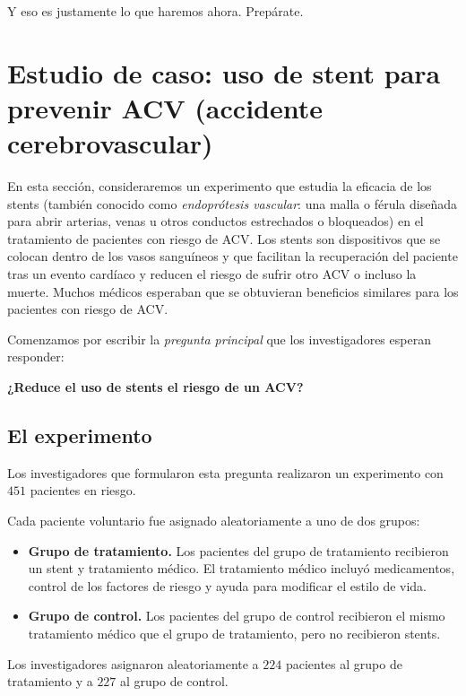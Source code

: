 \documentclass[
  spanish,
  letterpaper,
  DIV=11,
  numbers=noendperiod]{scrartcl}
\providecommand{\tightlist}{%
  \setlength{\itemsep}{0pt}\setlength{\parskip}{0pt}}
\begin{document}
Y eso es justamente lo que haremos ahora. Prepárate.

\section{Estudio de caso: uso de stent para prevenir ACV (accidente
cerebrovascular)}\label{estudio-de-caso-uso-de-stent-para-prevenir-acv-accidente-cerebrovascular}

En esta sección, consideraremos un experimento que estudia la eficacia
de los stents (también conocido como \emph{endoprótesis vascular}: una
malla o férula diseñada para abrir arterias, venas u otros conductos
estrechados o bloqueados) en el tratamiento de pacientes con riesgo de
ACV. Los stents son dispositivos que se colocan dentro de los vasos
sanguíneos y que facilitan la recuperación del paciente tras un evento
cardíaco y reducen el riesgo de sufrir otro ACV o incluso la muerte.
Muchos médicos esperaban que se obtuvieran beneficios similares para los
pacientes con riesgo de ACV.

Comenzamos por escribir la \emph{pregunta principal} que los
investigadores esperan responder:

\textbf{¿Reduce el uso de stents el riesgo de un ACV?}

\subsection{El experimento}\label{el-experimento}

Los investigadores que formularon esta pregunta realizaron un
experimento con \(451\) pacientes en riesgo.

Cada paciente voluntario fue asignado aleatoriamente a uno de dos
grupos:

\begin{itemize}
\tightlist
\item
  \textbf{Grupo de tratamiento.} Los pacientes del grupo de tratamiento
  recibieron un stent y tratamiento médico. El tratamiento médico
  incluyó medicamentos, control de los factores de riesgo y ayuda para
  modificar el estilo de vida.
\item
  \textbf{Grupo de control.} Los pacientes del grupo de control
  recibieron el mismo tratamiento médico que el grupo de tratamiento,
  pero no recibieron stents.
\end{itemize}

Los investigadores asignaron aleatoriamente a \(224\) pacientes al grupo
de tratamiento y a \(227\) al grupo de control.
\end{document}
